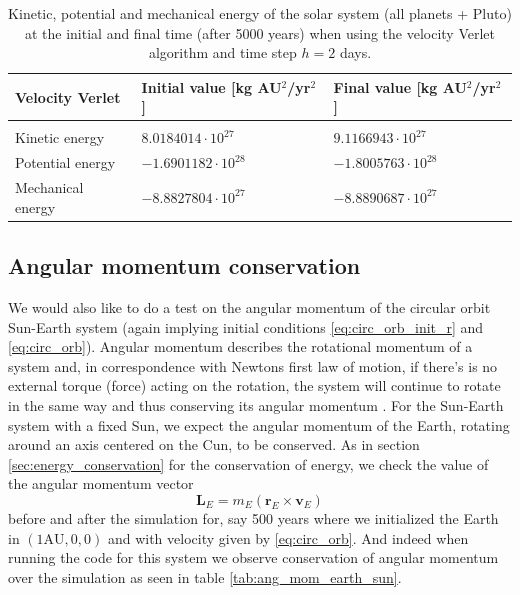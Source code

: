 \documentclass[12pt]{article}
\numberwithin{figure}{section}
\numberwithin{table}{section}
\begin{document}
\begin{table}[ht]
\begin{center}
  \begin{tabular}{| l | l | l |}
  \hline
    Velocity Verlet &  Initial value [kg AU$^2$/yr$^2$] & Final value [kg AU$^2$/yr$^2$]\\[0.10cm]\hline\hline
     & &\\
     Kinetic energy & $8.0184014\cdot 10^{27}$ & $9.1166943\cdot 10^{27}$\\[0.10cm]
     Potential energy & $-1.6901182\cdot 10^{28}$ & $-1.8005763\cdot 10^{28}$\\[0.10cm]
     Mechanical energy & $-8.8827804\cdot 10^{27}$ & $-8.8890687\cdot 10^{27}$\\[0.10cm]
     \hline
  \end{tabular}
\end{center}
\caption{Kinetic, potential and mechanical energy of the solar system (all planets + Pluto) at the initial and final time (after 5000 years) when using the velocity Verlet algorithm and time step $h=2$ days.}
\label{tab:energy_solar_system}
\end{table}

\subsection{Angular momentum conservation} \label{sec:ang_mom}
We would also like to do a test on the angular momentum of the circular orbit Sun-Earth system (again implying initial conditions \eqref{eq:circ_orb_init_r} and \eqref{eq:circ_orb}). Angular momentum describes the rotational momentum of a system and, in correspondence with Newtons first law of motion, if there's is no external torque (force) acting on the rotation, the system will continue to rotate in the same way and thus conserving its angular momentum \cite{ang_mom_conserve}. For the Sun-Earth system with a fixed Sun, we expect the angular momentum of the Earth, rotating around an axis centered on the Cun, to be conserved. As in section \ref{sec:energy_conservation} for the conservation of energy, we check the value of the angular momentum vector
\begin{equation}
	\mathbf{L}_E=m_E(\mathbf{r}_E\times\mathbf{v}_E) \label{eq:ang_mom}
\end{equation}
before and after the simulation for, say 500 years where we initialized the Earth in $(1\text{AU},0,0)$ and with velocity given by \eqref{eq:circ_orb}. And indeed when running the code for this system we observe conservation of angular momentum over the simulation as seen in table \ref{tab:ang_mom_earth_sun}.
\end{document}
